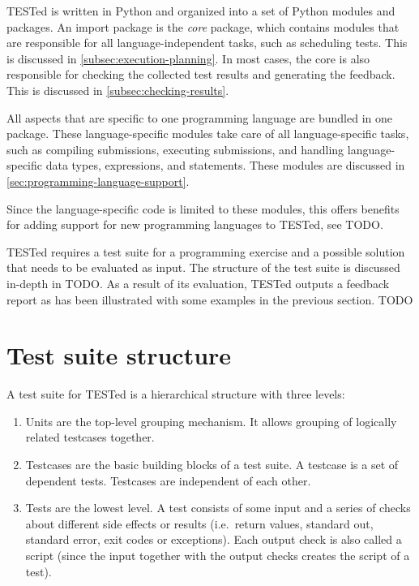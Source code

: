 \documentclass[../main]{subfiles}
\begin{document}
\leavevmode{}%
TESTed is written in Python and organized into a set of Python modules and packages.
An import package is the \emph{core} package, which contains modules that are responsible for all language-independent tasks, such as scheduling tests.
This is discussed in \cref{subsec:execution-planning}.
In most cases, the core is also responsible for checking the collected test results and generating the feedback.
This is discussed in \cref{subsec:checking-results}.

All aspects that are specific to one programming language are bundled in one package.
These language-specific modules take care of all language-specific tasks, such as compiling submissions, executing submissions, and handling language-specific data types, expressions, and statements.
These modules are discussed in \cref{sec:programming-language-support}.

Since the language-specific code is limited to these modules, this offers benefits for adding support for new programming languages to TESTed, see TODO.

TESTed requires a test suite for a programming exercise and a possible solution that needs to be evaluated as input.
The structure of the test suite is discussed in-depth in TODO.
As a result of its evaluation, TESTed outputs a feedback report as has been illustrated with some examples in the previous section. TODO


\section{Test suite structure}
\label{sec:test-suite-structure}

A test suite for TESTed is a hierarchical structure with three levels:


\begin{enumerate}
    \item Units are the top-level grouping mechanism.
          It allows grouping of logically related testcases together.
    \item Testcases are the basic building blocks of a test suite.
          A testcase is a set of dependent tests.
          Testcases are independent of each other.
    \item Tests are the lowest level.
          A test consists of some input and a series of checks about different side effects or results (i.e.\ return values, standard out, standard error, exit codes or exceptions).
          Each output check is also called a script (since the input together with the output checks creates the script of a test).
\end{enumerate}
\end{document}
